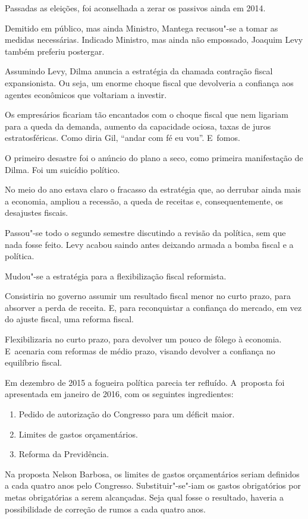 Passadas as eleições, foi aconselhada a zerar os passivos ainda em 2014.

Demitido em público, mas ainda Ministro, Mantega recusou"-se a tomar as
medidas necessárias. Indicado Ministro, mas ainda não empossado, Joaquim
Levy também preferiu postergar.

Assumindo Levy, Dilma anuncia a estratégia da chamada contração fiscal
expansionista. Ou seja, um enorme choque fiscal que devolveria a
confiança aos agentes econômicos que voltariam a investir.

Os empresários ficariam tão encantados com o choque fiscal que nem
ligariam para a queda da demanda, aumento da capacidade ociosa, taxas de
juros estratosféricas. Como diria Gil, ``andar com fé eu vou''. E~fomos.

O primeiro desastre foi o anúncio do plano a seco, como primeira
manifestação de Dilma. Foi um suicídio político.

No meio do ano estava claro o fracasso da estratégia que, ao derrubar
ainda mais a economia, ampliou a recessão, a queda de receitas e,
consequentemente, os desajustes fiscais.

Passou"-se todo o segundo semestre discutindo a revisão da política, sem
que nada fosse feito. Levy acabou saindo antes deixando armada a bomba
fiscal e a política.

Mudou"-se a estratégia para a flexibilização fiscal reformista.

Consistiria no governo assumir um resultado fiscal menor no curto prazo,
para absorver a perda de receita. E, para reconquistar a confiança do
mercado, em vez do ajuste fiscal, uma reforma fiscal.

Flexibilizaria no curto prazo, para devolver um pouco de fôlego à
economia. E~acenaria com reformas de médio prazo, visando devolver a
confiança no equilíbrio fiscal.

Em dezembro de 2015 a fogueira política parecia ter refluído. A~proposta
foi apresentada em janeiro de 2016, com os seguintes ingredientes:

\begin{enumerate}
\itemsep1pt\parskip0pt
\item
  Pedido de autorização do Congresso para um déficit maior.
\item
  Limites de gastos orçamentários.
\item
  Reforma da Previdência.
\end{enumerate}

Na proposta Nelson Barbosa, os limites de gastos orçamentários seriam
definidos a cada quatro anos pelo Congresso. Substituir"-se"-iam os gastos
obrigatórios por metas obrigatórias a serem alcançadas. Seja qual fosse
o resultado, haveria a possibilidade de correção de rumos a cada quatro
anos.

